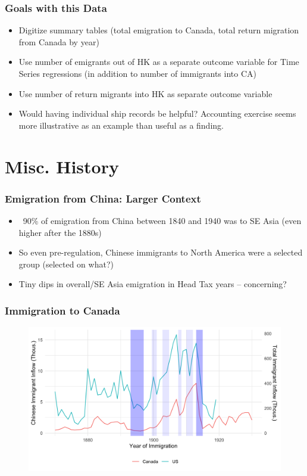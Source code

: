 \documentclass[pdf]{beamer}
\begin{document}
\begin{frame}
    \frametitle{Goals with this Data}
    \begin{itemize}
        \item Digitize summary tables (total emigration to Canada, total return migration from Canada by year)
        \item Use number of emigrants out of HK as a separate outcome variable for Time Series regressions (in addition to number of immigrants into CA)
        \item Use number of return migrants into HK as separate outcome variable
        \item Would having individual ship records be helpful? Accounting exercise seems more illustrative as an example than useful as a finding.
    \end{itemize}
\end{frame}

\section{Misc. History}
\begin{frame}[label = chinaflow]
    \frametitle{Emigration from China: Larger Context}
    \begin{itemize}
        \item ~90\% of emigration from China between 1840 and 1940 was to SE Asia (even higher after the 1880s)
        \item So even pre-regulation, Chinese immigrants to North America were a selected group (selected on what?)
        \item Tiny dips in overall/SE Asia emigration in Head Tax years -- concerning?  \hyperlink{china_emig_mckeown}{}
    \end{itemize}
\end{frame}

\begin{frame}[label = immflow]
    \frametitle{Immigration to Canada}
    \centering
    \begin{figure}
        \includegraphics[width = \textwidth]{../../figs/6sep23/immflow.png}
    \end{figure}
\end{frame}
\end{document}
